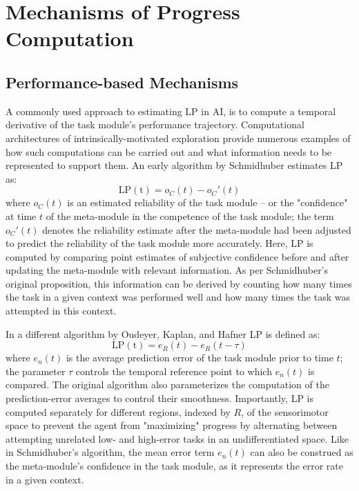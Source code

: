 \section{Mechanisms of Progress Computation}

\subsection{Performance-based Mechanisms}\label{subsec:performance-based_mechanisms}

A commonly used approach to estimating \ac{LP} in \ac{AI}, is to compute a temporal derivative of the task module's performance trajectory. Computational architectures of intrinsically-motivated exploration provide numerous examples of how such computations can be carried out and what information needs to be represented to support them. An early algorithm by Schmidhuber \cite{schmidhuber_curious_1991} estimates \ac{LP} as:
\begin{equation}
    \mathrm{LP(t)} = o_C(t) - o_C'(t)
\end{equation}
where $o_C(t)$ is an estimated reliability of the task module -- or the "confidence" at time $t$ of the meta-module in the competence of the task module; the term $o_C'(t)$ denotes the reliability estimate after the meta-module had been adjusted to predict the reliability of the task module more accurately. Here, \ac{LP} is computed by comparing point estimates of subjective confidence before and after updating the meta-module with relevant information. As per Schmidhuber's original proposition, this information can be derived by counting how many times the task in a given context was performed well and how many times the task was attempted in this context.

In a different algorithm by Oudeyer, Kaplan, and Hafner \cite{oudeyer_intrinsic_2007} \ac{LP} is defined as:
\begin{equation}
    \mathrm{LP(t)} = e_R(t) - e_R(t-\tau)
\end{equation}
where $e_n(t)$ is the average prediction error of the task module prior to time $t$; the parameter $\tau$ controls the temporal reference point to which $e_n(t)$ is compared. The original algorithm also parameterizes the computation of the prediction-error averages to control their smoothness. Importantly, \ac{LP} is computed separately for different regions, indexed by $R$, of the sensorimotor space to prevent the agent from "maximizing" progress by alternating between attempting unrelated low- and high-error tasks in an undifferentiated space. Like in Schmidhuber's algorithm, the mean error term $e_n(t)$ can also be construed as the meta-module's confidence in the task module, as it represents the error rate in a given context. 

